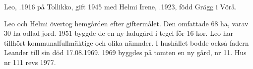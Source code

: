 Leo, .1916 på Tollikko, gift 1945 med Helmi Irene, .1923, född Grägg i Vörå.
\begin{jhchildren}
  \item {}
  \item {}
  \item {}
  \item {}
  \item {}
\end{jhchildren}
Leo och Helmi övertog hemgården efter giftermålet. Den omfattade 68 ha, varav 30 ha odlad jord. 1951 byggde de en ny ladugård i tegel för 16 kor. Leo har tillhört kommunalfullmäktige och olika nämnder. I hushållet bodde också fadern Leander till sin död 17.08.1969. 1969 byggdes på tomten en ny gård, nr 11. Hus nr 111 revs 1977.


